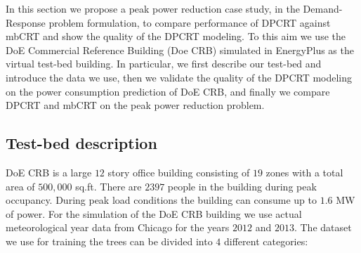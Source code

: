 \textcolor[rgb]{0.00,0.00,1.00}{In this section we propose a peak power reduction case study, in the Demand-Response problem formulation, to compare performance of DPCRT against mbCRT and show the quality of the DPCRT modeling. To this aim we use the DoE Commercial Reference Building (Doe CRB) simulated in EnergyPlus \cite{DeruFieldStuderEtAl2011} as the virtual test-bed building. In particular, we first  describe our test-bed and introduce the data we use, then we validate the quality of the DPCRT modeling on the power consumption prediction of DoE CRB, and finally we compare DPCRT and mbCRT on the peak power reduction problem.}

\subsection{Test-bed description}
DoE CRB is a large $12$ story office building consisting of $19$ zones with a total area of $500,000$ sq.ft. There are $2397$ people in the building during peak occupancy. During peak load conditions the building can consume up to $1.6$ MW of power. For the simulation of the DoE CRB building we use actual meteorological year data from Chicago for the years $2012$ and $2013$. The dataset we use for training the trees can be divided into $4$ different categories:
